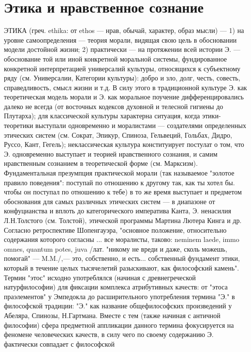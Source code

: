 \documentclass[12pt]{article}
\begin{document}
\section{Этика и нравственное сознание}
ЭТИКА (греч. ethika: от ethos — нрав, обычай, характер, образ мысли) — 1) на уровне самоопределения —
теория морали, видящая свою цель в обосновании модели достойной жизни; 2) практически — на протяжении
всей истории Э. — обоснование той или иной конкретной моральной системы, фундированное конкретной
интерпретацией  универсалий  культуры,  относящихся  к  субъектному  ряду  (см.  Универсалии,  Категории
культуры): добро и зло, долг, честь, совесть, справедливость, смысл жизни и т.д. В силу этого в традиционной
культуре Э. как теоретическая модель морали и Э. как моральное поучение дифференцировались далеко не
всегда  (от  восточных  кодексов  духовной  и  телесной  гигиены  до  Плутарха);  для  классической  культуры
характерна  ситуация,  когда  этики-теоретики  выступали  одновременно  и  моралистами  —  создателями
определенных этических систем (см. Сократ, Эпикур, Спиноза, Гельвеций, Гольбах, Дидро, Руссо, Кант, Гегель);
неклассическая  культура  конституирует  постулат  о  том,  что  Э.  одновременно  выступает  и  теорией
нравственного  сознания,  и  самим  нравственным  сознанием  в  теоретической  форме  (см.  Марксизм).
Фундаментальная презумпция практической морали (так называемое "золотое правило поведения": поступай по
отношению к другому так, как ты хотел бы. чтобы он поступал по отношению к тебе) в то же время выступает и
предметом обоснования для самых различных этических систем — в диапазоне от конфуцианства и вплоть до
категорического императива Канта, Э. ненасилия Л.Н.Толстого (см. Толстой), этической программы Мартина
Лютера Кинга и др. Согласно ретроспективе Шопенгауэра, "основное положение, относительно содержания
которого согласны ... все моралисты, таково: neminem laede, immo omnes, quantum potes, juva /лат. "никому не
вреди и даже, сколь можешь, помогай" — M.M./,— это, собственно, и есть... собственный фундамент этики,
который  в  течение  целых  тысячелетий  разыскивают,  как  философский  камень".  Термин  "этос"  исходно
употреблялся (начиная с древнегреческой натурфилософии) для фиксации комплекса атрибутивных качеств: от
"этоса праэлементов" у Эмпедокла до расширительного употребления термина "Э." в философской традиции: 
"Э." как название общефилософских произведений у Абеляра, Спинозы, Н.Гартмана. Вместе с тем (также
начиная с античной философии) сфера предметной аппликации данного термина фокусируется на феномене
человеческих  качеств,  в  силу  чего  по  своему  содержанию  Э.  фактически  совпадает  с  философской
\end{document}
